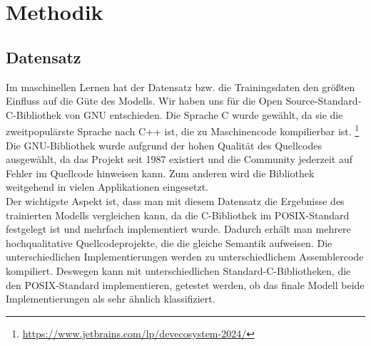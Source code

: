 \documentclass[12pt,letterpaper,ngerman]{article}
\begin{document}
\pagebreak
\section{Methodik}
\subsection{Datensatz}
Im maschinellen Lernen hat der Datensatz bzw. die Trainingsdaten
den größten Einfluss auf die Güte des Modells. Wir haben uns 
für die Open Source-Standard-C-Bibliothek von GNU entschieden. 
Die Sprache C wurde gewählt, da sie die zweitpopulärste Sprache 
nach C++ ist, die zu Maschinencode kompilierbar ist.
\footnote{\url{https://www.jetbrains.com/lp/devecosystem-2024/}}
Die GNU-Bibliothek wurde aufgrund der hohen Qualität des 
Quellcodes ausgewählt, da das Projekt seit 1987 existiert 
und die Community jederzeit auf Fehler im Quellcode hinweisen kann.
Zum anderen wird die Bibliothek weitgehend in vielen Applikationen 
eingesetzt.\\
Der wichtigste Aspekt ist, dass man mit diesem Datensatz 
die Ergebnisse des trainierten Modells vergleichen kann, da die 
C-Bibliothek im POSIX-Standard festgelegt ist und mehrfach 
implementiert wurde. Dadurch erhält man mehrere hochqualitative 
Quellcodeprojekte, die die gleiche Semantik aufweisen. Die 
unterschiedlichen Implementierungen werden zu unterschiedlichem 
Assemblercode kompiliert. Deswegen kann mit unterschiedlichen 
Standard-C-Bibliotheken, die den POSIX-Standard implementieren,
getestet werden, ob das finale Modell beide Implementierungen 
als sehr ähnlich klassifiziert.

\end{document}
